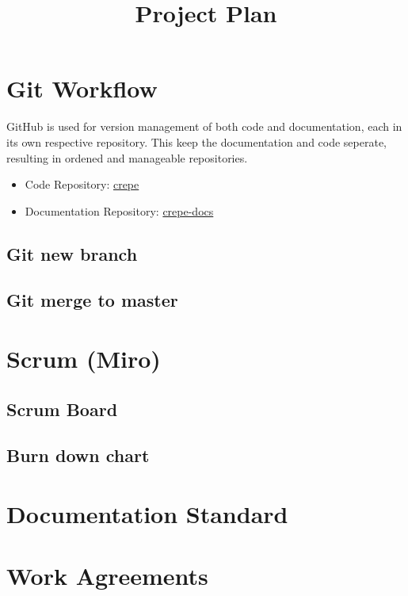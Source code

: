 \documentclass{projdoc}
\title{Project Plan}
\begin{document}
\section{Git Workflow}

GitHub is used for version management of both code and documentation, each in its own respective repository.
This keep the documentation and code seperate, resulting in ordened and manageable repositories. 

\begin{itemize}
    \item Code Repository: \href{https://github.com/lonkaars/crepe}{crepe}
    \item Documentation Repository: \href{https://github.com/lonkaars/crepe-docs}{crepe-docs}
\end{itemize}

\subsection{Git new branch}
\subsection{Git merge to master}
\newpage

\section{Scrum (Miro)}
\subsection{Scrum Board}
\subsection{Burn down chart}
\newpage

\section{Documentation Standard}
\newpage

\section{Work Agreements}
\end{document}
